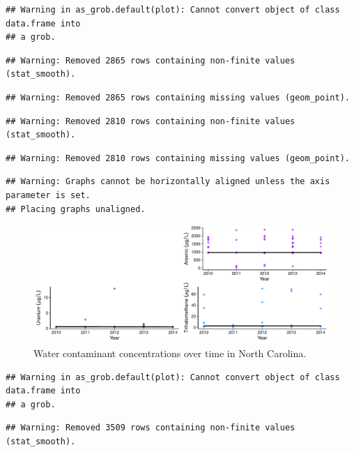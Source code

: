 \documentclass[12pt,]{article}
\begin{document}
\begin{verbatim}
## Warning in as_grob.default(plot): Cannot convert object of class data.frame into
## a grob.
\end{verbatim}

\begin{verbatim}
## Warning: Removed 2865 rows containing non-finite values (stat_smooth).
\end{verbatim}

\begin{verbatim}
## Warning: Removed 2865 rows containing missing values (geom_point).
\end{verbatim}

\begin{verbatim}
## Warning: Removed 2810 rows containing non-finite values (stat_smooth).
\end{verbatim}

\begin{verbatim}
## Warning: Removed 2810 rows containing missing values (geom_point).
\end{verbatim}

\begin{verbatim}
## Warning: Graphs cannot be horizontally aligned unless the axis parameter is set.
## Placing graphs unaligned.
\end{verbatim}

\begin{figure}
\centering
\includegraphics{Project_Template_files/figure-latex/figs5-1.pdf}
\caption{Water contaminant concentrations over time in North Carolina.}
\end{figure}

\begin{verbatim}
## Warning in as_grob.default(plot): Cannot convert object of class data.frame into
## a grob.
\end{verbatim}

\begin{verbatim}
## Warning: Removed 3509 rows containing non-finite values (stat_smooth).
\end{verbatim}
\end{document}
